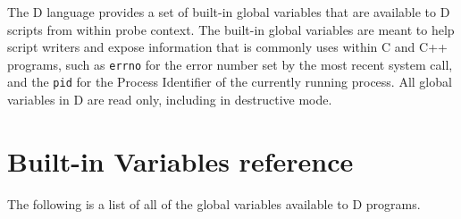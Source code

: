 
The D language provides a set of built-in global variables that are
available to D scripts from within probe context.  The built-in global
variables are meant to help script writers and expose information that
is commonly uses within C and C++ programs, such as \verb|errno| for
the error number set by the most recent system call, and the
\verb|pid| for the Process Identifier of the currently running
process.  All global variables in D are read only, including in
destructive mode.

\section{Built-in Variables reference}
\label{sec:builtin-variables-ref}

The following is a list of all of the global variables available to D
programs.





























